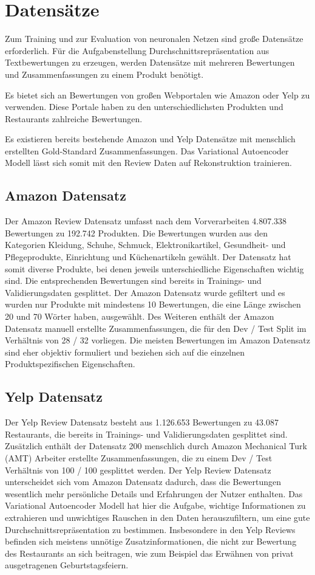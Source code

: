 \section{Datensätze}\raggedbottom
Zum Training und zur Evaluation von neuronalen Netzen sind große Datensätze erforderlich. Für die Aufgabenstellung Durchschnittsrepräsentation aus Textbewertungen zu erzeugen, werden Datensätze mit mehreren Bewertungen und Zusammenfassungen zu einem Produkt benötigt.

Es bietet sich an Bewertungen von großen Webportalen wie Amazon oder Yelp zu verwenden. 
Diese Portale haben zu den unterschiedlichsten Produkten und Restaurants zahlreiche Bewertungen.

Es existieren bereits bestehende Amazon und Yelp Datensätze mit menschlich erstellten Gold-Standard Zusammenfassungen. 
Das Variational Autoencoder Modell lässt sich somit mit den Review Daten auf Rekonstruktion trainieren.

\subsection{Amazon Datensatz}
Der Amazon Review Datensatz \citep{brazinskas2020-unsupervised} umfasst nach dem Vorverarbeiten 4.807.338 Bewertungen zu 192.742 Produkten. 
Die Bewertungen wurden aus den Kategorien Kleidung, Schuhe, Schmuck, Elektronikartikel, Gesundheit- und Pflegeprodukte, Einrichtung und Küchenartikeln gewählt.
Der Datensatz hat somit diverse Produkte, bei denen jeweils unterschiedliche Eigenschaften wichtig sind.
Die entsprechenden Bewertungen sind bereits in Trainings- und Validierungsdaten gesplittet.
Der Amazon Datensatz wurde gefiltert und es wurden nur Produkte mit mindestens 10 Bewertungen, die eine Länge zwischen 20 und 70 Wörter haben, ausgewählt.
Des Weiteren enthält der Amazon Datensatz manuell erstellte Zusammenfassungen, die für den Dev / Test Split im Verhältnis von 28 / 32 vorliegen.
Die meisten Bewertungen im Amazon Datensatz sind eher objektiv formuliert und beziehen sich auf die einzelnen Produktspezifischen Eigenschaften.
\subsection{Yelp Datensatz}
Der Yelp Review Datensatz \citep{pmlr-v97-chu19b} besteht aus 1.126.653 Bewertungen zu 43.087 Restaurants, die bereits in Trainings- und Validierungsdaten gesplittet sind. 
Zusätzlich enthält der Datensatz 200 menschlich durch Amazon Mechanical Turk (AMT) Arbeiter erstellte Zusammenfassungen, die zu einem Dev / Test Verhältnis von 100 / 100 gesplittet werden. 
Der Yelp Review Datensatz unterscheidet sich vom Amazon Datensatz dadurch, dass die Bewertungen wesentlich mehr persönliche Details und Erfahrungen der Nutzer enthalten.
Das Variational Autoencoder Modell hat hier die Aufgabe, wichtige Informationen zu extrahieren und unwichtiges Rauschen in den Daten herauszufiltern, um eine gute Durchschnittsrepräsentation zu bestimmen.
Insbesondere in den Yelp Reviews befinden sich meistens unnötige Zusatzinformationen, die nicht zur Bewertung des Restaurants an sich beitragen, wie zum Beispiel das Erwähnen von privat ausgetragenen Geburtstagsfeiern. 
\pagebreak

